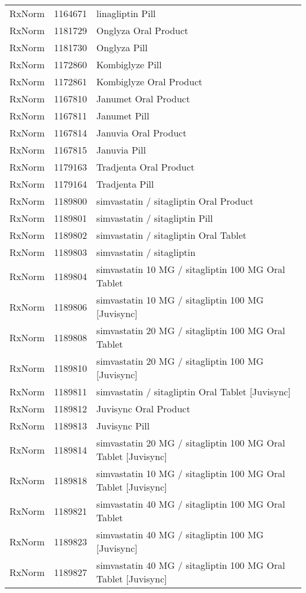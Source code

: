 \begin{longtable}{p{}p{}p{}}
  RxNorm & 1164671 & linagliptin Pill \\ 
  RxNorm & 1181729 & Onglyza Oral Product \\ 
  RxNorm & 1181730 & Onglyza Pill \\ 
  RxNorm & 1172860 & Kombiglyze Pill \\ 
  RxNorm & 1172861 & Kombiglyze Oral Product \\ 
  RxNorm & 1167810 & Janumet Oral Product \\ 
  RxNorm & 1167811 & Janumet Pill \\ 
  RxNorm & 1167814 & Januvia Oral Product \\ 
  RxNorm & 1167815 & Januvia Pill \\ 
  RxNorm & 1179163 & Tradjenta Oral Product \\ 
  RxNorm & 1179164 & Tradjenta Pill \\ 
  RxNorm & 1189800 & simvastatin / sitagliptin Oral Product \\ 
  RxNorm & 1189801 & simvastatin / sitagliptin Pill \\ 
  RxNorm & 1189802 & simvastatin / sitagliptin Oral Tablet \\ 
  RxNorm & 1189803 & simvastatin / sitagliptin \\ 
  RxNorm & 1189804 & simvastatin 10 MG / sitagliptin 100 MG Oral Tablet \\ 
  RxNorm & 1189806 & simvastatin 10 MG / sitagliptin 100 MG [Juvisync] \\ 
  RxNorm & 1189808 & simvastatin 20 MG / sitagliptin 100 MG Oral Tablet \\ 
  RxNorm & 1189810 & simvastatin 20 MG / sitagliptin 100 MG [Juvisync] \\ 
  RxNorm & 1189811 & simvastatin / sitagliptin Oral Tablet [Juvisync] \\ 
  RxNorm & 1189812 & Juvisync Oral Product \\ 
  RxNorm & 1189813 & Juvisync Pill \\ 
  RxNorm & 1189814 & simvastatin 20 MG / sitagliptin 100 MG Oral Tablet [Juvisync] \\ 
  RxNorm & 1189818 & simvastatin 10 MG / sitagliptin 100 MG Oral Tablet [Juvisync] \\ 
  RxNorm & 1189821 & simvastatin 40 MG / sitagliptin 100 MG Oral Tablet \\ 
  RxNorm & 1189823 & simvastatin 40 MG / sitagliptin 100 MG [Juvisync] \\ 
  RxNorm & 1189827 & simvastatin 40 MG / sitagliptin 100 MG Oral Tablet [Juvisync] \\ 

\end{longtable}
